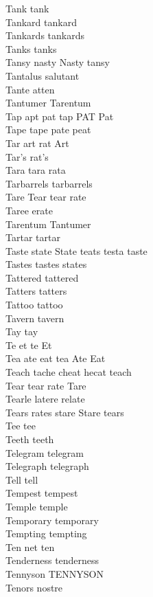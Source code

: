 Tank tank\\
Tankard tankard\\
Tankards tankards\\
Tanks tanks\\
Tansy nasty Nasty tansy\\
Tantalus salutant\\
Tante atten\\
Tantumer Tarentum\\
Tap apt pat tap PAT Pat\\
Tape tape pate peat\\
Tar art rat Art\\
Tar's rat's\\
Tara tara rata\\
Tarbarrels tarbarrels\\
Tare Tear tear rate\\
Taree erate\\
Tarentum Tantumer\\
Tartar tartar\\
Taste state State teats testa taste\\
Tastes tastes states\\
Tattered tattered\\
Tatters tatters\\
Tattoo tattoo\\
Tavern tavern\\
Tay tay\\
Te et te Et\\
Tea ate eat tea Ate Eat\\
Teach tache cheat hecat teach\\
Tear tear rate Tare\\
Tearle latere relate\\
Tears rates stare Stare tears\\
Tee tee\\
Teeth teeth\\
Telegram telegram\\
Telegraph telegraph\\
Tell tell\\
Tempest tempest\\
Temple temple\\
Temporary temporary\\
Tempting tempting\\
Ten net ten\\
Tenderness tenderness\\
Tennyson TENNYSON\\
Tenors nostre\\
